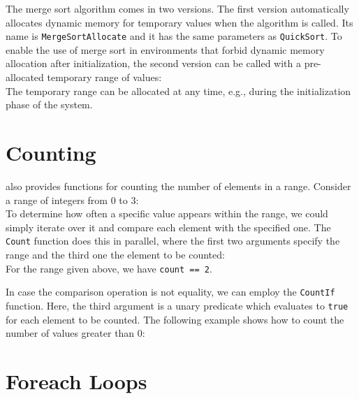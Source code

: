 The merge sort algorithm comes in two versions. The first version automatically allocates dynamic memory for temporary values when the algorithm is called. Its name is \lstinline|MergeSortAllocate| and it has the same parameters as \lstinline|QuickSort|. To enable the use of merge sort in environments that forbid dynamic memory allocation after initialization, the second version can be called with a pre-allocated temporary range of values:
%
\\
%
The temporary range can be allocated at any time, e.g., during the initialization phase of the system.

\section{Counting}
\label{sec:algorithms_counting}

\embb also provides functions for counting the number of elements in a range. Consider a range of integers from 0 to 3:
%
\\
%
To determine how often a specific value appears within the range, we could simply iterate over it and compare each element with the specified one. The \lstinline|Count| function does this in parallel, where the first two arguments specify the range and the third one the element to be counted:
%
\\
%
For the range given above, we have \lstinline|count == 2|.

In case the comparison operation is not equality, we can employ the \lstinline|CountIf| function. Here, the third argument is a unary predicate which evaluates to \lstinline|true| for each element to be counted. The following example shows how to count the number of values greater than 0:
%
\\

\section{Foreach Loops}
\label{sec:algorithms_foreach}

